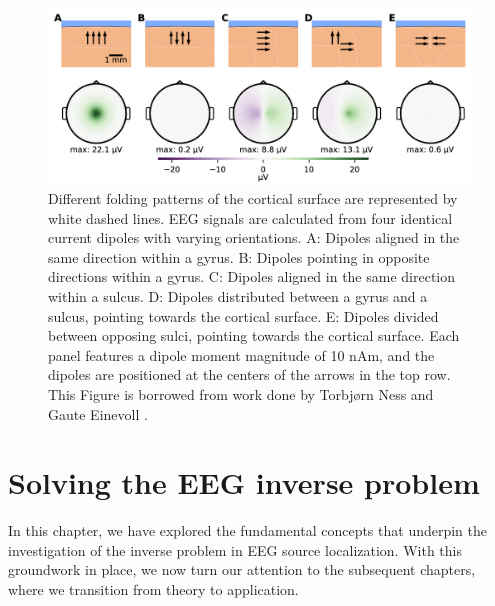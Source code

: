 \documentclass[a4paper, UKenglish, 11pt]{uiomaster}
\begin{document}
\begin{figure}[!htb]
    \centering
    \includegraphics[width=\linewidth]{figures/dipole_orientation.png}
    \caption{Different folding patterns of the cortical surface are represented by white dashed lines. EEG signals are calculated from four identical current dipoles with varying orientations. A: Dipoles aligned in the same direction within a gyrus. B: Dipoles pointing in opposite directions within a gyrus. C: Dipoles aligned in the same direction within a sulcus. D: Dipoles distributed between a gyrus and a sulcus, pointing towards the cortical surface. E: Dipoles divided between opposing sulci, pointing towards the cortical surface.
    Each panel features a dipole moment magnitude of 10 nAm, and the dipoles are positioned at the centers of the arrows in the top row. This Figure is borrowed from work done by Torbjørn Ness and Gaute Einevoll \cite{naess2021biophysically}.}
    \label{fig:dipole_orientation}
\end{figure}




\section{Solving the EEG inverse problem}
In this chapter, we have explored the fundamental concepts that underpin the investigation of the inverse problem in EEG source localization. With this groundwork in place, we now turn our attention to the subsequent chapters, where we transition from theory to application.
\end{document}
